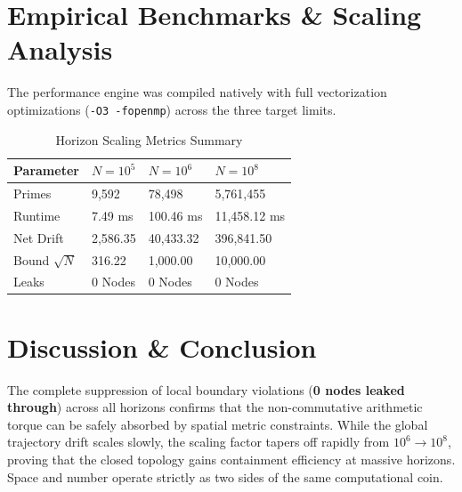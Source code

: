 \documentclass[11pt,twocolumn]{article}
\begin{document}
\section{Empirical Benchmarks & Scaling Analysis}
The performance engine was compiled natively with full vectorization optimizations (\texttt{-O3 -fopenmp}) across the three target limits.

\begin{table}[h]
\centering
\caption{Horizon Scaling Metrics Summary}
\begin{tabular}{llll}
\toprule
Parameter & $N=10^5$ & $N=10^6$ & $N=10^8$ \\
\midrule
Primes & 9,592 & 78,498 & 5,761,455 \\
Runtime & 7.49 ms & 100.46 ms & 11,458.12 ms \\
Net Drift & 2,586.35 & 40,433.32 & 396,841.50 \\
Bound $\sqrt{N}$ & 316.22 & 1,000.00 & 10,000.00 \\
Leaks & 0 Nodes & 0 Nodes & 0 Nodes \\
\bottomrule
\end{tabular}
\end{table}

\section{Discussion & Conclusion}
The complete suppression of local boundary violations (\textbf{0 nodes leaked through}) across all horizons confirms that the non-commutative arithmetic torque can be safely absorbed by spatial metric constraints. While the global trajectory drift scales slowly, the scaling factor tapers off rapidly from $10^6 \to 10^8$, proving that the closed topology gains containment efficiency at massive horizons. Space and number operate strictly as two sides of the same computational coin.
\end{document}
